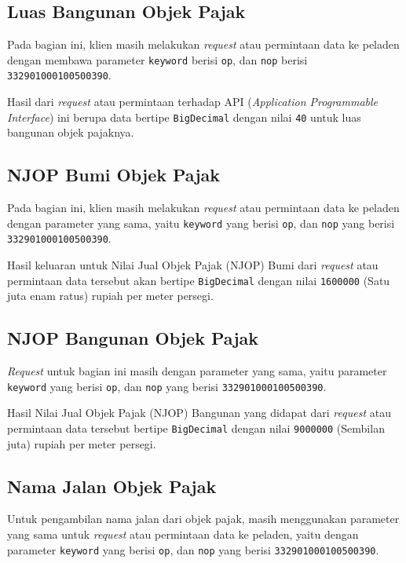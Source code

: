 \subsection{Luas Bangunan Objek Pajak}

Pada bagian ini, klien masih melakukan \textit{request} atau permintaan data ke peladen dengan membawa parameter \texttt{keyword} berisi \texttt{op}, dan \texttt{nop} berisi \texttt{332901000100500390}.

Hasil dari \textit{request} atau permintaan terhadap API (\textit{Application Programmable Interface}) ini berupa data bertipe \texttt{BigDecimal} dengan nilai \texttt{40} untuk luas bangunan objek pajaknya.

\subsection{NJOP Bumi Objek Pajak}

Pada bagian ini, klien masih melakukan \textit{request} atau permintaan data ke peladen dengan parameter yang sama, yaitu \texttt{keyword} yang berisi \texttt{op}, dan \texttt{nop} yang berisi \texttt{332901000100500390}.

Hasil keluaran untuk Nilai Jual Objek Pajak (NJOP) Bumi dari \textit{request} atau permintaan data tersebut akan bertipe \texttt{BigDecimal} dengan nilai \texttt{1600000} (Satu juta enam ratus) rupiah per meter persegi.

\subsection{NJOP Bangunan Objek Pajak}

\textit{Request} untuk bagian ini masih dengan parameter yang sama, yaitu parameter \texttt{keyword} yang berisi \texttt{op}, dan \texttt{nop} yang berisi \texttt{332901000100500390}.

Hasil Nilai Jual Objek Pajak (NJOP) Bangunan yang didapat dari \textit{request} atau permintaan data tersebut bertipe \texttt{BigDecimal} dengan nilai \texttt{9000000} (Sembilan juta) rupiah per meter persegi.

\subsection{Nama Jalan Objek Pajak}

Untuk pengambilan nama jalan dari objek pajak, masih menggunakan parameter yang sama untuk \textit{request} atau permintaan data ke peladen, yaitu dengan parameter \texttt{keyword} yang berisi \texttt{op}, dan \texttt{nop} yang berisi \texttt{332901000100500390}.

